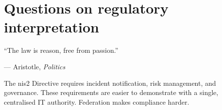 \section{Questions on regulatory interpretation}
\label{sec:q-regulatory}

\epigraph{``The law is reason, free from passion.''}{--- Aristotle, \textit{Politics}}

\begin{questionbox}
The \gls{nis2} Directive requires incident notification, risk management, and governance. These requirements are easier to demonstrate with a single, centralised IT authority. Federation makes compliance harder.
\end{questionbox}

